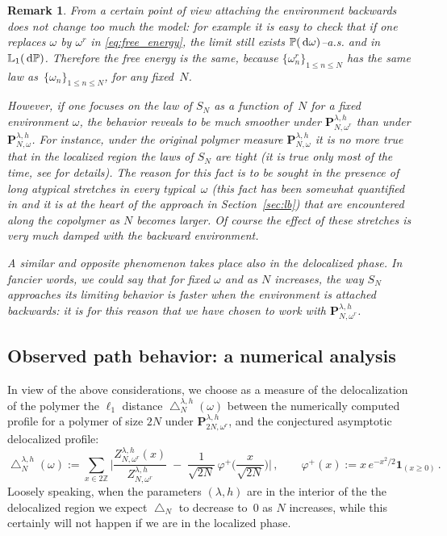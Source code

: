 \documentclass[reqno,11pt]{amsart}
\numberwithin{equation}{section}
\newtheorem{rem}[theorem]{Remark}
\newcommand{\ind}{\mathbf{1}}
\newcommand{\Z}{\mathbb{Z}}
\newcommand{\bP}{{\ensuremath{\mathbf P}} }
\newcommand{\dd}{\,\text{\rm d}}             %
\newcommand{\bbL}{{\ensuremath{\mathbb L}} }
\newcommand{\bbP}{{\ensuremath{\mathbb P}} }
\newcommand{\gp}{\varphi}
\newcommand{\go}{\omega}
\newcommand{\gl}{\lambda}
\begin{document}
\begin{rem} \label{rem:backward} \rm
From a certain point of view attaching the environment backwards does not change too much the model: for example it is easy to check that if one replaces $\go$ by $\go^r$ in \eqref{eq:free_energy}, the limit still exists $\bbP(\dd\go)$--a.s. and in $\bbL_1(\dd\bbP)$. Therefore the free energy is the same, because $\{\go^r_n\}_{1\le n \le N}$ has the same law as~$\{\go_n\}_{1\le n \le N}$, for any fixed~$N$.

However, if one focuses  on the law of $S_N$ as a function of~$N$ \textsl{for a fixed environment} $\go$, the behavior reveals to be much smoother under $\bP_{N,\go^r}^{\gl,h}$ than under $\bP_{N,\go}^{\gl,h}$. For instance, under the original polymer measure $\bP_{N,\go}^{\gl,h}$ it is no more true that in the localized region the laws of $S_N$ are tight (it is true only {\sl most of the time}, see \cite{cf:G} for details). The reason for this fact is to be sought in the presence of long {\sl atypical} stretches in every typical~$\go$ (this fact has been somewhat quantified in \cite[Section 4]{cf:GT} and it is at the heart of the approach in Section~\ref{sec:lb}) that are encountered along the copolymer as $N$ becomes larger. Of course the effect of these stretches is very much damped with the backward environment.

A similar and opposite phenomenon takes place also in the delocalized phase. In fancier words, we could say that for fixed $\go$ and as $N$ increases, the way $S_N$ approaches its {\sl limiting behavior} is faster when the environment is attached backwards: it is for this reason that we have
chosen to work with $\bP_{N,\go^r}^{\gl,h}$.
\end{rem}

\subsection{Observed path behavior: a numerical analysis}
In view of the above considerations, we choose as a measure of the delocalization of the polymer the
$\ell_1$ distance $\bigtriangleup _N^{\gl,h}(\go)$ between the numerically computed profile for a polymer of size $2N$ under $\bP_{2N,\go^r}^{\gl,h}$, and the conjectured asymptotic delocalized profile:
\begin{equation}
    \bigtriangleup _N^{\gl, h}(\go) := \sum_{x \in 2\Z} \Bigg| \frac{Z_{N,\go^r}^{\gl,h}(x)}{Z_{N,\go^r}^{\gl,h}} \;-\; \frac{1}{\sqrt{2N}} \, \varphi^+ \bigg( \frac{x}{\sqrt{2N}} \bigg) \Bigg|\,,  \qquad \gp^+(x) := x \, e^{-x^2/2} \ind_{(x\ge 0)}\,.
\end{equation}
Loosely speaking, when the parameters $(\gl,h)$ are in the interior of the the delocalized region we expect $\bigtriangleup _N$ to decrease to~$0$ as $N$ increases, while this certainly will not happen if we are in the localized phase.
\end{document}
